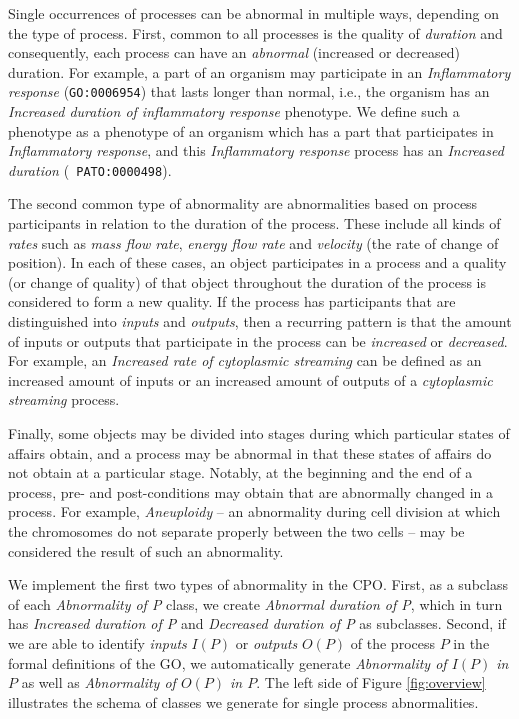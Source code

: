 \documentclass{bioinfo}
\begin{document}
Single occurrences of processes can be abnormal in multiple ways,
depending on the type of process.
%
First, common to all processes is the quality of {\em duration} and
consequently, each process can have an {\em abnormal} (increased or
decreased) duration. For example, a part of an organism may
participate in an {\em Inflammatory response} ({\tt GO:0006954}) that
lasts longer than normal, i.e., the organism has an {\em Increased
  duration of inflammatory response} phenotype. We define such a
phenotype as a phenotype of an organism which has a part that
participates in {\em Inflammatory response}, and this {\em
  Inflammatory response} process has an {\em Increased duration} ({\tt
  PATO:0000498}).

The second common type of abnormality are abnormalities based on
process participants in relation to the duration of the process. These
include all kinds of {\em rates} such as {\em mass flow rate}, {\em
  energy flow rate} and {\em velocity} (the rate of change of
position). In each of these cases, an object participates in a process
and a quality (or change of quality) of that object throughout the
duration of the process is considered to form a new quality. If the
process has participants that are distinguished into {\em inputs} and
{\em outputs}, then a recurring pattern is that the amount of inputs
or outputs that participate in the process can be {\em increased} or
{\em decreased}. For example, an {\em Increased rate of cytoplasmic
  streaming} can be defined as an increased amount of inputs or an
increased amount of outputs of a {\em cytoplasmic streaming} process.

Finally, some objects may be divided into stages during which
particular states of affairs obtain, and a process may be abnormal in
that these states of affairs do not obtain at a particular
stage. Notably, at the beginning and the end of a process, pre- and
post-conditions may obtain that are abnormally changed in a
process. For example, {\em Aneuploidy} -- an abnormality during cell
division at which the chromosomes do not separate properly between the
two cells -- may be considered the result of such an abnormality.

We implement the first two types of abnormality in the CPO. First, as
a subclass of each {\em Abnormality of P} class, we create {\em
  Abnormal duration of P}, which in turn has {\em Increased duration
  of P} and {\em Decreased duration of P} as subclasses. Second, if we
are able to identify {\em inputs} $I(P)$ or {\em outputs} $O(P)$ of
the process $P$ in the formal definitions of the GO, we automatically
generate {\em Abnormality of $I(P)$ in $P$} as well as {\em
  Abnormality of $O(P)$ in $P$}.  The left side of Figure
\ref{fig:overview} illustrates the schema of classes we generate for
single process abnormalities.
\end{document}

